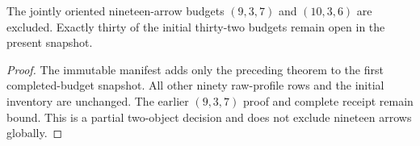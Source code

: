 \begin{corollary}
\label{CP2:A-two-object-nineteen-second-closed-budget}
The jointly oriented nineteen-arrow budgets $(9,3,7)$ and
$(10,3,6)$ are excluded.  Exactly thirty of the initial
thirty-two budgets remain open in the present snapshot.
\end{corollary}
\begin{proof}
The immutable manifest
adds only the preceding theorem to the first completed-budget
snapshot.  All other ninety raw-profile rows and the initial
inventory are unchanged.  The earlier $(9,3,7)$ proof and
complete receipt remain bound.  This is a partial two-object
decision and does not exclude nineteen arrows globally.
\end{proof}
